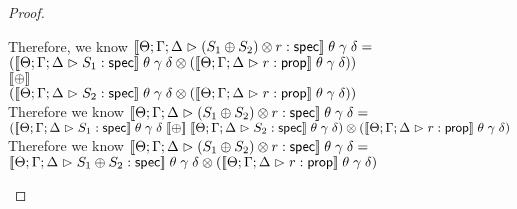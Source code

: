 \begin{proof}
\begin{itemize}
\begin{tabbedproof}
        \oo Therefore, we know $[\![{{\Theta; \Gamma; \Delta} \vartriangleright {{(S_1 \oplus S_2)} \otimes {r}} : \mathsf{spec}}]\!]\;\theta\;\gamma\;\delta = $ \\
        \oox                   $({[\![{{\Theta; \Gamma; \Delta} \vartriangleright {S_1} : \mathsf{spec}}]\!]\;\theta\;\gamma\;\delta} \otimes {([\![{{\Theta; \Gamma; \Delta} \vartriangleright {r} : {\mathsf{prop}}}]\!]\;\theta\;\gamma\;\delta)})$ \\
        \oox $[\![{\oplus}]\!]$ \\
        \oox $({[\![{{\Theta; \Gamma; \Delta} \vartriangleright {S_2} : \mathsf{spec}}]\!]\;\theta\;\gamma\;\delta} \otimes {([\![{{\Theta; \Gamma; \Delta} \vartriangleright {r} : {\mathsf{prop}}}]\!]\;\theta\;\gamma\;\delta)})$ \\
        \oo Therefore we know $[\![{{\Theta; \Gamma; \Delta} \vartriangleright {{(S_1 \oplus S_2)} \otimes {r}} : \mathsf{spec}}]\!]\;\theta\;\gamma\;\delta = $ \\
        \oox $\Frame{(\interp{\judgeS{S_1}}\;\theta\;\gamma\;\delta \;\interp{\oplus}\; \interp{\judgeS{S_2}}\;\theta\;\gamma\;\delta)}
                    {(\interp{\judgeA{r}{\assert}}\;\theta\;\gamma\;\delta)}$ \\
        \oo Therefore we know $[\![{{\Theta; \Gamma; \Delta} \vartriangleright {{(S_1 \oplus S_2)} \otimes {r}} : \mathsf{spec}}]\!]\;\theta\;\gamma\;\delta = $ \\
        \oox ${[\![{{\Theta; \Gamma; \Delta} \vartriangleright {S_1 \oplus S_2} : \mathsf{spec}}]\!]\;\theta\;\gamma\;\delta} \otimes {([\![{{\Theta; \Gamma; \Delta} \vartriangleright {r} : {\mathsf{prop}}}]\!]\;\theta\;\gamma\;\delta)}$ \\
      \end{tabbedproof}


\end{itemize}
\end{proof}
